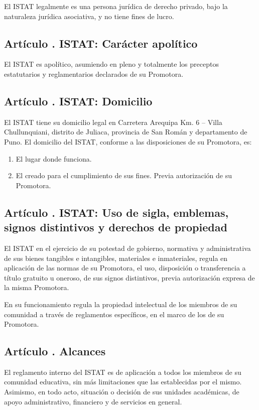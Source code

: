El ISTAT legalmente es una persona jurídica de derecho privado, bajo la naturaleza jurídica asociativa, y no tiene fines de lucro. 
\subsection{Artículo . ISTAT: Carácter apolítico}
\addtocounter{ns}{1}
El ISTAT es apolítico, asumiendo en pleno y totalmente los preceptos estatutarios y reglamentarios declarados de su Promotora.
\subsection{Artículo . ISTAT: Domicilio}
\addtocounter{ns}{1}
El ISTAT tiene su domicilio legal en Carretera Arequipa Km. 6 – Villa Chullunquiani, distrito de Juliaca, provincia de San Román y departamento de Puno. 
El domicilio del ISTAT, conforme a las disposiciones de su Promotora, es:
\begin{enumerate}
\item El lugar donde funciona.
\item El creado para el cumplimiento de sus fines. Previa autorización de su Promotora.
\end{enumerate}
\subsection{Artículo . ISTAT: Uso de sigla, emblemas, signos distintivos y derechos de propiedad}
\addtocounter{ns}{1}
El ISTAT en el ejercicio de su potestad de gobierno, normativa y administrativa de sus bienes tangibles e intangibles, materiales e inmateriales, regula en aplicación de las normas de su Promotora, el uso, disposición o transferencia a título gratuito u oneroso, de sus signos distintivos, previa autorización expresa de la misma Promotora. 

En su funcionamiento regula la propiedad intelectual de los miembros de su comunidad a través de reglamentos específicos, en el marco de los de su Promotora.

\subsection{Artículo . Alcances}
\addtocounter{ns}{1}
El reglamento interno del ISTAT es de aplicación a todos los miembros de su comunidad educativa, sin más limitaciones que las establecidas por el mismo. Asimismo, en todo acto, situación o decisión de sus unidades académicas, de apoyo administrativo, financiero y de servicios en general.
